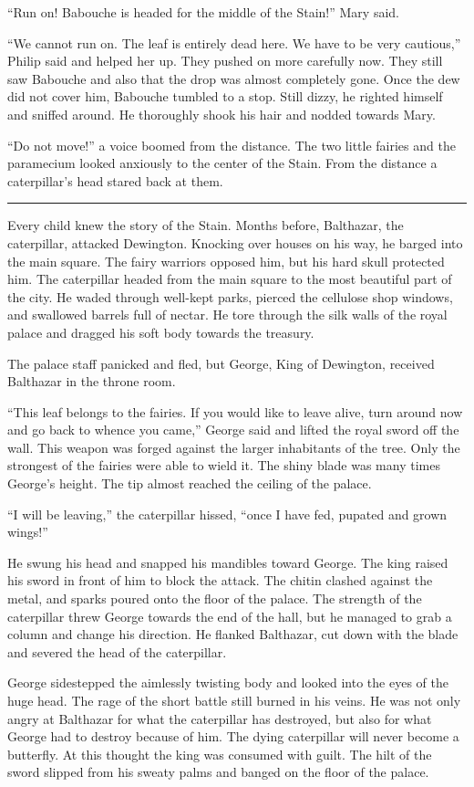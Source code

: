 \documentclass[10pt, draft]{memoir}
\renewcommand{\pfbreakdisplay}{\bigskip \ding{166} \bigskip}
\newcommand{\secbreak}{\fancybreak{\pfbreakdisplay}}
\begin{document}
``Run on! Babouche is headed for the middle of the Stain!'' Mary said.

``We cannot run on. The leaf is entirely dead here. We have to be very cautious,'' Philip said and helped her up. They pushed on more carefully now. They still saw Babouche and also that the drop was almost completely gone. Once the dew did not cover him, Babouche tumbled to a stop. Still dizzy, he righted himself and sniffed around. He thoroughly shook his hair and nodded towards Mary.

``Do not move!'' a voice boomed from the distance. The two little fairies and the paramecium looked anxiously to the center of the Stain. From the distance a caterpillar's head stared back at them.

\secbreak

Every child knew the story of the Stain. Months before, Balthazar, the caterpillar, attacked Dewington. Knocking over houses on his way, he barged into the main square. The fairy warriors opposed him, but his hard skull protected him. The caterpillar headed from the main square to the most beautiful part of the city. He waded through well-kept parks, pierced the cellulose shop windows, and swallowed barrels full of nectar. He tore through the silk walls of the royal palace and dragged his soft body towards the treasury.

The palace staff panicked and fled, but George, King of Dewington, received Balthazar in the throne room.

``This leaf belongs to the fairies. If you would like to leave alive, turn around now and go back to whence you came,'' George said and lifted the royal sword off the wall. This weapon was forged against the larger inhabitants of the tree. Only the strongest of the fairies were able to wield it. The shiny blade was many times George's height. The tip almost reached the ceiling of the palace.

``I will be leaving,'' the caterpillar hissed, ``once I have fed, pupated and grown wings!''

He swung his head and snapped his mandibles toward George. The king raised his sword in front of him to block the attack. The chitin clashed against the metal, and sparks poured onto the floor of the palace. The strength of the caterpillar threw George towards the end of the hall, but he managed to grab a column and change his direction. He flanked Balthazar, cut down with the blade and severed the head of the caterpillar.

George sidestepped the aimlessly twisting body and looked into the eyes of the huge head. The rage of the short battle still burned in his veins. He was not only angry at Balthazar for what the caterpillar has destroyed, but also for what George had to destroy because of him. The dying caterpillar will never become a butterfly. At this thought the king was consumed with guilt. The hilt of the sword slipped from his sweaty palms and banged on the floor of the palace.
\end{document}
